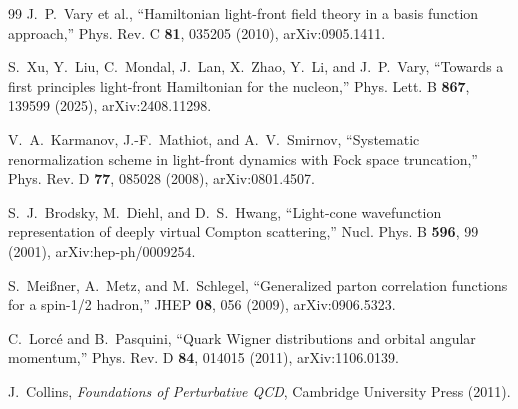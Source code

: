 \documentclass[11pt]{article}
\begin{document}
\begin{thebibliography}{99}
J.~P.~Vary et al.,
``Hamiltonian light-front field theory in a basis function approach,''
Phys. Rev. C \textbf{81}, 035205 (2010),
arXiv:0905.1411.

S.~Xu, Y.~Liu, C.~Mondal, J.~Lan, X.~Zhao, Y.~Li, and J.~P.~Vary,
``Towards a first principles light-front Hamiltonian for the nucleon,''
Phys. Lett. B \textbf{867}, 139599 (2025),
arXiv:2408.11298.

V.~A.~Karmanov, J.-F.~Mathiot, and A.~V.~Smirnov,
``Systematic renormalization scheme in light-front dynamics with Fock space
truncation,''
Phys. Rev. D \textbf{77}, 085028 (2008),
arXiv:0801.4507.

S.~J.~Brodsky, M.~Diehl, and D.~S.~Hwang,
``Light-cone wavefunction representation of deeply virtual Compton scattering,''
Nucl. Phys. B \textbf{596}, 99 (2001),
arXiv:hep-ph/0009254.

S.~Mei{\ss}ner, A.~Metz, and M.~Schlegel,
``Generalized parton correlation functions for a spin-1/2 hadron,''
JHEP \textbf{08}, 056 (2009),
arXiv:0906.5323.

C.~Lorc\'e and B.~Pasquini,
``Quark Wigner distributions and orbital angular momentum,''
Phys. Rev. D \textbf{84}, 014015 (2011),
arXiv:1106.0139.

J.~Collins,
\emph{Foundations of Perturbative QCD},
Cambridge University Press (2011).

\end{thebibliography}
\end{document}
